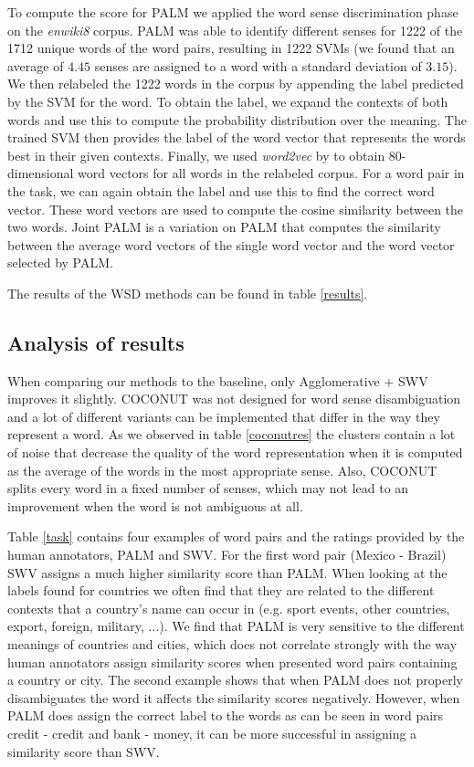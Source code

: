 \documentclass[11pt]{article}
\begin{document}
To compute the score for PALM we applied the word sense discrimination phase on the \textit{enwiki8} corpus. PALM was able to identify different senses for 1222 of the 1712 unique words of the word pairs, resulting in 1222 SVMs  (we found that an average of $4.45$ senses are assigned to a word with a standard deviation of $3.15$). We then relabeled the 1222 words in the corpus by appending the label predicted by the SVM for the word. To obtain the label, we expand the contexts of both words and use this to compute the probability distribution over the meaning. The trained SVM then provides the label of the word vector that represents the words best in their given contexts. Finally, we used \textit{word2vec} by \cite{word2vec} to obtain 80-dimensional word vectors for all words in the relabeled corpus. For a word pair in the task, we can again obtain the label and use this to find the correct word vector. These word vectors are used to compute the cosine similarity between the two words. Joint PALM is a variation on PALM that computes the similarity between the average word vectors of the single word vector and the word vector selected by PALM.

The results of the WSD methods can be found in table \ref{results}.

\subsection{Analysis of results}
When comparing our methods to the baseline, only Agglomerative + SWV improves it slightly. COCONUT was not designed for word sense disambiguation and a lot of different variants can be implemented that differ in the way they represent a word. As we observed in table \ref{coconutres} the clusters contain a lot of noise that decrease the quality of the word representation when it is computed as the average of the words in the most appropriate sense. Also, COCONUT splits every word in a fixed number of senses, which may not lead to an improvement when the word is not ambiguous at all. 

Table \ref{task} contains four examples of word pairs and the ratings provided by the human annotators, PALM and SWV. For the first word pair (Mexico - Brazil) SWV assigns a much higher similarity score than PALM. When looking at the labels found for countries we often find that they are related to the different contexts that a country's name can occur in (e.g. sport events, other countries, export, foreign, military, $\dots$). We find that PALM is very sensitive to the different meanings of countries and cities, which does not correlate strongly with the way human annotators assign similarity scores when presented word pairs containing a country or city. The second example shows that when PALM does not properly disambiguates the word it affects the similarity scores negatively. However, when PALM does assign the correct label to the words as can be seen in word pairs credit - credit and bank - money, it can be more successful in assigning a similarity score than SWV.
\end{document}
